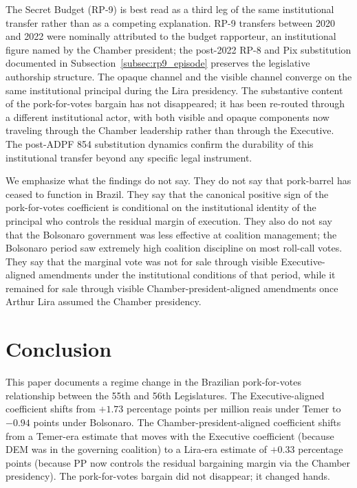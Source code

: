 \documentclass[preprint,12pt,authoryear]{elsarticle}
\begin{document}
The Secret Budget (RP-9) is best read as a third leg of the same institutional transfer rather than as a competing explanation. RP-9 transfers between 2020 and 2022 were nominally attributed to the budget rapporteur, an institutional figure named by the Chamber president; the post-2022 RP-8 and Pix substitution documented in Subsection~\ref{subsec:rp9_episode} preserves the legislative authorship structure. The opaque channel and the visible channel converge on the same institutional principal during the Lira presidency. The substantive content of the pork-for-votes bargain has not disappeared; it has been re-routed through a different institutional actor, with both visible and opaque components now traveling through the Chamber leadership rather than through the Executive. The post-ADPF 854 substitution dynamics confirm the durability of this institutional transfer beyond any specific legal instrument.

We emphasize what the findings do not say. They do not say that pork-barrel has ceased to function in Brazil. They say that the canonical positive sign of the pork-for-votes coefficient is conditional on the institutional identity of the principal who controls the residual margin of execution. They also do not say that the Bolsonaro government was less effective at coalition management; the Bolsonaro period saw extremely high coalition discipline on most roll-call votes. They say that the marginal vote was not for sale through visible Executive-aligned amendments under the institutional conditions of that period, while it remained for sale through visible Chamber-president-aligned amendments once Arthur Lira assumed the Chamber presidency.

\section{Conclusion}
\label{sec:conclusion}

This paper documents a regime change in the Brazilian pork-for-votes relationship between the 55th and 56th Legislatures. The Executive-aligned coefficient shifts from $+1.73$ percentage points per million reais under Temer to $-0.94$ points under Bolsonaro. The Chamber-president-aligned coefficient shifts from a Temer-era estimate that moves with the Executive coefficient (because DEM was in the governing coalition) to a Lira-era estimate of $+0.33$ percentage points (because PP now controls the residual bargaining margin via the Chamber presidency). The pork-for-votes bargain did not disappear; it changed hands.
\end{document}

